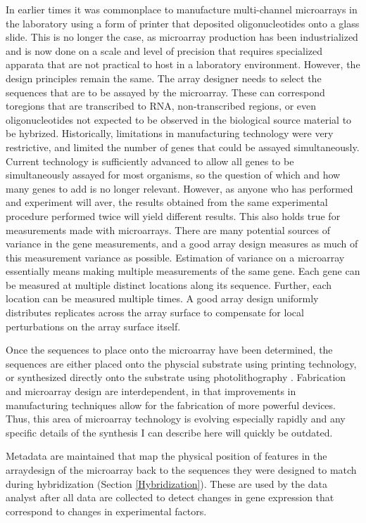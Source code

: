 In earlier times it was commonplace to manufacture multi-channel microarrays in
the laboratory using a form of printer that deposited oligonucleotides onto a
glass slide.  This is no longer the case, as microarray production has been
industrialized and is now done on a scale and level of precision that requires
specialized apparata that are not practical to host in a laboratory
environment.  However, the design principles remain the same.  The array
designer needs to select the sequences that are to be assayed by the
microarray.  These can correspond toregions that are transcribed to RNA,
non-transcribed regions, or even oligonucleotides not expected to be observed
in the biological source material to be hybrized.  Historically, limitations in
manufacturing technology were very restrictive, and limited the number of genes
that could be assayed simultaneously.  Current technology is sufficiently
advanced to allow all genes to be simultaneously assayed for most organisms, so
the question of which and how many genes to add is no longer relevant.
However, as anyone who has performed and experiment will aver, the results
obtained from the same experimental procedure performed twice will yield
different results.  This also holds true for measurements made with
microarrays.  There are many potential sources of variance in the gene
measurements, and a good array design measures as much of this measurement
variance as possible.  Estimation of variance on a microarray essentially means
making multiple measurements of the same gene.  Each gene can be measured at
multiple distinct locations along its sequence.  Further, each location can be
measured multiple times.  A good array design uniformly distributes replicates
across the array surface to compensate for local perturbations on the array
surface itself.

Once the sequences to place onto the microarray have been determined, the
sequences are either placed onto the physcial substrate using printing
technology, or synthesized directly onto the substrate using photolithography
\cite{fodor,lipshutz}.  Fabrication and microarray design are interdependent,
in that improvements in manufacturing techniques allow for the fabrication of
more powerful devices.  Thus, this area of microarray technology is evolving
especially rapidly and any specific details of the synthesis I can describe
here will quickly be outdated.

Metadata are maintained that map the physical position of features in the
arraydesign of the microarray back to the sequences they were designed to match
during hybridization (Section \ref{Hybridization}).  These are used by the data
analyst after all data are collected to detect changes in gene expression that
correspond to changes in experimental factors.

